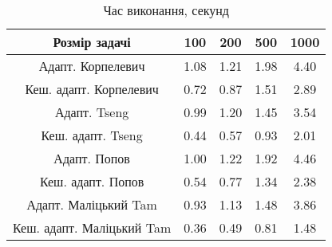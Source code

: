 \begin{table}[H]
	\centering
	\begin{tabular}{|c||c|c|c|c|}\hline
		Розмір задачі & 100 & 200 & 500 & 1000 \\ \hline \hline
		Адапт. Корпелевич & 1.08 & 1.21 & 1.98 & 4.40 \\ \hline
		Кеш. адапт. Корпелевич & 0.72 & 0.87 & 1.51 & 2.89 \\ \hline
		Адапт. Tseng & 0.99 & 1.20 & 1.45 & 3.54 \\ \hline
		Кеш. адапт. Tseng & 0.44 & 0.57 & 0.93 & 2.01 \\ \hline
		Адапт. Попов & 1.00 & 1.22 & 1.92 & 4.46 \\ \hline
		Кеш. адапт. Попов & 0.54 & 0.77 & 1.34 & 2.38 \\ \hline
		Адапт. Маліцький Tam & 0.93 & 1.13 & 1.48 & 3.86 \\ \hline
		Кеш. адапт. Маліцький Tam & 0.36 & 0.49 & 0.81 & 1.48 \\ \hline
	\end{tabular}
	\caption{Час виконання, секунд}
\end{table}
